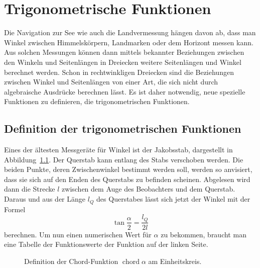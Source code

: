 %
%
%
\section{Trigonometrische Funktionen
\label{buch:geometrie:section:trigonometrisch}}
Die Navigation zur See wie auch die Landvermessung hängen davon ab,
dass man Winkel zwischen Himmelskörpern, Landmarken oder dem Horizont
messen kann.
Aus solchen Messungen können dann mittels bekannter Beziehungen
zwischen den Winkeln und Seitenlängen in Dreiecken weitere Seitenlängen
und Winkel berechnet werden.
Schon in rechtwinkligen Dreiecken sind die Beziehungen zwischen Winkel
und Seitenlängen von einer Art, die sich nicht durch algebraische
Ausdrücke berechnen lässt.
Es ist daher notwendig, neue spezielle Funktionen zu definieren,
die trigonometrischen Funktionen.

%
%
\subsection{Definition der trigonometrischen Funktionen}
Eines der ältesten Messgeräte für Winkel ist der Jakobsstab,
dargestellt in Abbildung~\ref{}.
Der Querstab kann entlang des Stabs verschoben werden.
Die beiden Punkte, deren Zwischenwinkel bestimmt werden soll,
werden so anvisiert, dass sie sich auf den Enden des Querstabs 
zu befinden scheinen.
Abgelesen wird dann die Strecke $l$ zwischen dem Auge des Beobachters
und dem Querstab.
Daraus und aus der Länge $l_Q$ des Querstabes lässt sich jetzt der Winkel
mit der Formel
\[
\tan\frac{\alpha}2 = \frac{l_Q}{2l}
\]
berechnen.
Um nun einen numerischen Wert für $\alpha$ zu bekommen, braucht man
eine Tabelle der Funktionswerte der Funktion auf der linken Seite.

\begin{figure}
\centering
{}
\caption{Definition der Chord-Funktion $\operatorname{chord}\alpha$
am Einheitskreis.
\label{buch:geometrie:trigo:chorddef}}
\end{figure}

